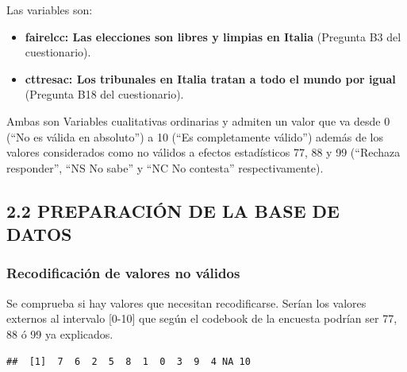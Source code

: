 \documentclass[
  12 pt,
  a4paper,
]{article}
\newenvironment{Shaded}{\begin{snugshade}}{\end{snugshade}}
\newcommand{\FunctionTok}[1]{\textcolor[rgb]{0.13,0.29,0.53}{\textbf{#1}}}
\newcommand{\NormalTok}[1]{#1}
\newcommand{\SpecialCharTok}[1]{\textcolor[rgb]{0.81,0.36,0.00}{\textbf{#1}}}
\providecommand{\tightlist}{%
  \setlength{\itemsep}{0pt}\setlength{\parskip}{0pt}}
\begin{document}
Las variables son:

\begin{itemize}
\tightlist
\item
  \textbf{fairelcc: Las elecciones son libres y limpias en Italia}
  (Pregunta B3 del cuestionario).
\item
  \textbf{cttresac: Los tribunales en Italia tratan a todo el mundo por
  igual} (Pregunta B18 del cuestionario).
\end{itemize}

Ambas son Variables cualitativas ordinarias y admiten un valor que va
desde 0 (``No es válida en absoluto'') a 10 (``Es completamente
válido'') además de los valores considerados como no válidos a efectos
estadísticos 77, 88 y 99 (``Rechaza responder'', ``NS No sabe'' y ``NC
No contesta'' respectivamente).

\subsection{2.2 PREPARACIÓN DE LA BASE DE
DATOS}\label{preparaciuxf3n-de-la-base-de-datos}

\subsubsection{Recodificación de valores no
válidos}\label{recodificaciuxf3n-de-valores-no-vuxe1lidos}

Se comprueba si hay valores que necesitan recodificarse. Serían los
valores externos al intervalo {[}0-10{]} que según el codebook de la
encuesta podrían ser 77, 88 ó 99 ya explicados.

\begin{Shaded}
\end{Shaded}

\begin{verbatim}
##  [1]  7  6  2  5  8  1  0  3  9  4 NA 10
\end{verbatim}

\begin{Shaded}
\end{Shaded}
\end{document}
